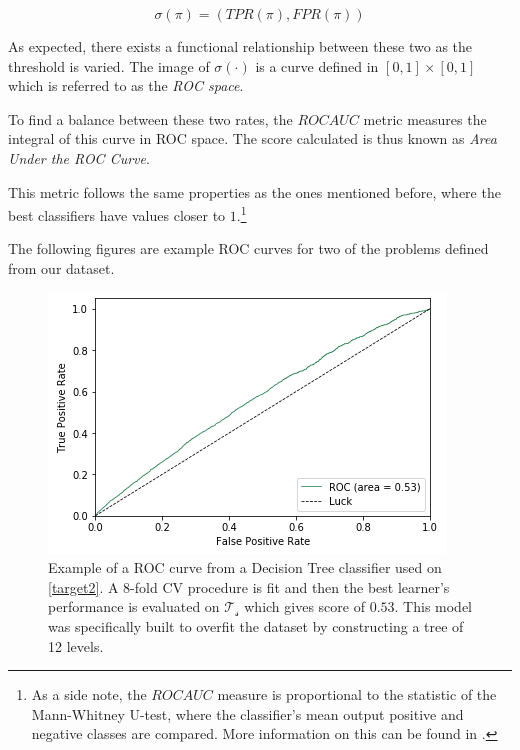 \begin{equation}
\sigma(\pi) = (TPR(\pi), FPR(\pi))
\end{equation}

As expected, there exists a functional relationship between these two as the threshold is varied.
The image of $\sigma(\cdot)$ is a curve defined in $[0,1]\times[0,1]$ which is referred to as the \textit{ROC space}.

To find a balance between these two rates, the $ROC AUC$ metric measures the integral of this curve in ROC space.
The score calculated is thus known as \textit{Area Under the ROC Curve}.

This metric follows the same properties as the ones mentioned before, where the best classifiers have values closer to $1$.\footnote{As a side note, the $ROC AUC$ measure is proportional to the statistic of the Mann-Whitney U-test, where the classifier's mean output positive and negative classes are compared.
More information on this can be found in \citep{mason-rocAucRelationship}.}

The following figures are example ROC curves for two of the problems defined from our dataset.


\begin{figure}[h!]
\begin{center}
\includegraphics[width=1\columnwidth]{figures/figure-lowROCAUC/figure-lowROCAUC_original}
\caption{Example of a ROC curve from a Decision Tree classifier used on \cref{target2}. A 8-fold CV procedure is fit and then the best learner's performance is evaluated on $\mathcal{T_s}$ which gives score of $0.53$. This model was specifically built to overfit the dataset by constructing a tree of 12 levels.}
\label{fg:lowROCAUC}
\end{center}
\end{figure}

